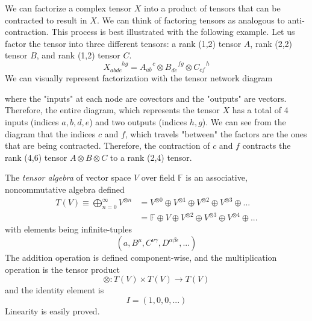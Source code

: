 \documentclass{article}
\begin{document}
    \begin{definition}
    We can factorize a complex tensor $X$ into a product of tensors that can be contracted to result in $X$. We can think of factoring tensors as analogous to anti-contraction. This process is best illustrated with the following example. Let us factor the tensor into three different tensors: a rank (1,2) tensor $A$, rank (2,2) tensor $B$, and rank (1,2) tensor $C$. 
    \[X_{abde}^{\;\;\;\;\;\;\;hg} = A_{ab}^{\;\;\;\;c} \otimes B_{de}^{\;\;\;\;fg} \otimes C_{cf}^{\;\;\;\;h}\]
    We can visually represent factorization with the tensor network diagram
    \begin{center}
    \end{center}
    where the "inputs" at each node are covectors and the "outputs" are vectors. Therefore, the entire diagram, which represents the tensor $X$ has a total of 4 inputs (indices $a, b, d, e$) and two outputs (indices $h, g$). We can see from the diagram that the indices $c$ and $f$, which travels "between" the factors are the ones that are being contracted. Therefore, the contraction of $c$ and $f$ contracts the rank (4,6) tensor $A \otimes B \otimes C$ to a rank (2,4) tensor. 
    \end{definition}

    \begin{definition}
    The \textit{tensor algebra} of vector space $V$ over field $\mathbb{F}$ is an associative, noncommutative algebra defined
    \begin{align*}
        T(V) \equiv \bigoplus_{n = 0}^{\infty} V^{\otimes n} & = V^{\otimes 0} \oplus V^{\otimes 1} \oplus V^{\otimes 2} \oplus V^{\otimes 3} \oplus ... \\
        & = \mathbb{F} \oplus V \oplus V^{\otimes 2} \oplus V^{\otimes 3} \oplus V^{\otimes 4} \oplus ...
    \end{align*}
    with elements being infinite-tuples
    \[ (a, B^\mu, C^{\nu \gamma}, D^{\alpha \beta \epsilon}, ...)\]
    The addition operation is defined component-wise, and the multiplication operation is the tensor product 
    \[\otimes: T(V) \times T(V) \longrightarrow T(V)\]
    and the identity element is
    \[I = (1, 0, 0, ...) \]
    Linearity is easily proved. 
    \end{definition}
\end{document}
